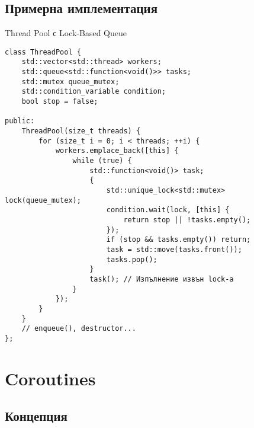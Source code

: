 \documentclass[aspectratio=169]{beamer}
\begin{document}
\subsection{Примерна имплементация}

\begin{frame}[fragile]{Thread Pool с Lock-Based Queue}
\begin{lstlisting}[basicstyle=\ttfamily\tiny]
class ThreadPool {
    std::vector<std::thread> workers;
    std::queue<std::function<void()>> tasks;
    std::mutex queue_mutex;
    std::condition_variable condition;
    bool stop = false;

public:
    ThreadPool(size_t threads) {
        for (size_t i = 0; i < threads; ++i) {
            workers.emplace_back([this] {
                while (true) {
                    std::function<void()> task;
                    {
                        std::unique_lock<std::mutex> lock(queue_mutex);
                        condition.wait(lock, [this] { 
                            return stop || !tasks.empty(); 
                        });
                        if (stop && tasks.empty()) return;
                        task = std::move(tasks.front());
                        tasks.pop();
                    }
                    task(); // Изпълнение извън lock-а
                }
            });
        }
    }
    // enqueue(), destructor...
};
\end{lstlisting}
\end{frame}

\section{Coroutines}

\subsection{Концепция}
\end{document}
